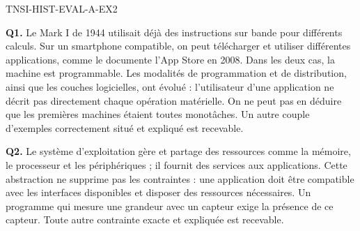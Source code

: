 \begin{corrige}{TNSI-HIST-EVAL-A-EX2}

\textbf{Q1.} Le Mark I de 1944 utilisait déjà des instructions sur bande
pour différents calculs. Sur un smartphone compatible, on peut télécharger
et utiliser différentes applications, comme le documente l'App Store en
2008. Dans les deux cas, la machine est programmable. Les modalités de
programmation et de distribution, ainsi que les couches logicielles, ont
évolué : l'utilisateur d'une application ne décrit pas directement chaque
opération matérielle. On ne peut pas en déduire que les premières machines
étaient toutes monotâches. Un autre couple d'exemples correctement situé
et expliqué est recevable.

\textbf{Q2.} Le système d'exploitation gère et partage des ressources
comme la mémoire, le processeur et les périphériques ; il fournit des
services aux applications. Cette abstraction ne supprime pas les contraintes :
une application doit être compatible avec les interfaces disponibles et
disposer des ressources nécessaires. Un programme qui mesure une grandeur
avec un capteur exige la présence de ce capteur. Toute autre contrainte
exacte et expliquée est recevable.

\end{corrige}
